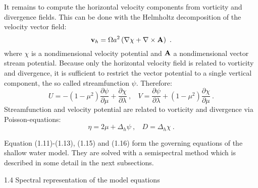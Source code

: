 It remains to compute the horizontal velocity components from vorticity and
divergence fields. This can be done with the {\sc Helmholtz} decomposition of the velocity vector field:
\begin{equation}
{\bf v}_h=\Omega a^ 2 \left ( \nabla \chi +  \nabla \times {\bf A} \right)~.
\end{equation}
where $\chi$ is a nondimensional velocity potential and ${\bf A}$ a nondimensional vector stream potential. Because only
the horizontal velocity field is related to vorticity and divergence, it is sufficient to
restrict the vector potential  to a single vertical component, the so called streamfunction $\psi$.
Therefore:
\begin{equation}
U  = \displaystyle  - ( 1 - \mu^2) \frac {\partial \psi} {\partial \mu} +  \frac {\partial \chi} {\partial \lambda}~,~~~~
V  = \displaystyle \frac {\partial \psi} {\partial \lambda} +  ( 1 - \mu^2) \frac {\partial \chi} {\partial \mu}~.
\end{equation}
Streamfunction and velocity potential are related to vorticity and divergence via 
{\sc Poisson}-equations:
\begin{equation}
\eta= 2 \mu + \Delta_h \psi~,~~~~D  
= \Delta_h \chi ~.
\end{equation}

Equation (1.11)-(1.13), (1.15) and (1.16) form the governing equations of the shallow water model.
They are solved with a semispectral method which is described in some detail in the next subsections.

{1.4 Spectral representation of the model equations}

\nopagebreak[4]

